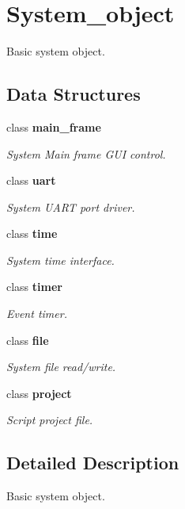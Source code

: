 \section{System\+\_\+object}
\label{group___system__object}


Basic system object.  


\subsection*{Data Structures}
\begin{DoxyCompactItemize}
\item 
class \textbf{ main\+\_\+frame}
\begin{DoxyCompactList}\small\item\em System Main frame G\+UI control. \end{DoxyCompactList}\item 
class \textbf{ uart}
\begin{DoxyCompactList}\small\item\em System U\+A\+RT port driver. \end{DoxyCompactList}\item 
class \textbf{ time}
\begin{DoxyCompactList}\small\item\em System time interface. \end{DoxyCompactList}\item 
class \textbf{ timer}
\begin{DoxyCompactList}\small\item\em Event timer. \end{DoxyCompactList}\item 
class \textbf{ file}
\begin{DoxyCompactList}\small\item\em System file read/write. \end{DoxyCompactList}\item 
class \textbf{ project}
\begin{DoxyCompactList}\small\item\em Script project file. \end{DoxyCompactList}\end{DoxyCompactItemize}


\subsection{Detailed Description}
Basic system object. 

